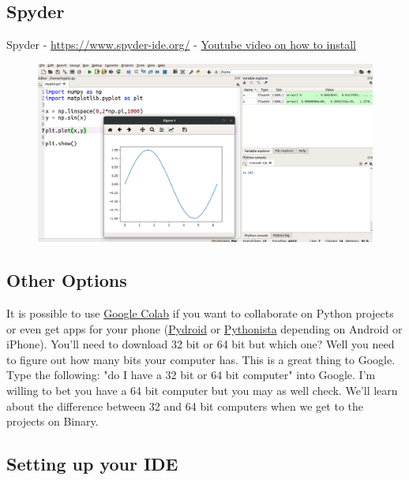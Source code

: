 \subsection{Spyder}

Spyder - \url{https://www.spyder-ide.org/} - \href{https://www.youtube.com/watch?v=OjYwET-6QtE&list=PL_D7_GvGz-v1RsDs_OdNW65qRjEjmpfQx&index=35}{Youtube video on how to install}

\begin{figure}[H]
  \begin{center}
    \includegraphics[width=\textwidth]{Figures/Spyder.png}
  \end{center}
\end{figure}

\subsection{Other Options}

It is possible to use
\href{https://colab.research.google.com/drive/1-VzSDojevQZ6A0oJNol9YXV6SRp3FKeP}{Google
  Colab} if you want to collaborate on Python projects or even get apps for your phone (\href{https://play.google.com/store/apps/details?id=ru.iiec.pydroid3&hl=en_US&gl=US}{Pydroid} or \href{https://apps.apple.com/us/app/pythonista-3/id1085978097}{Pythonista}
depending on Android or iPhone). You'll need to download 32 bit or 64
bit but which one? Well you need to figure out how many bits your
computer has. This is a great thing to Google. Type the following: "do
I have a 32 bit or 64 bit computer" into Google. I’m willing to bet
you have a 64 bit computer but you may as well check. We’ll learn
about the difference between 32 and 64 bit computers when we get to
the projects on Binary.

\subsection{Setting up your IDE}

